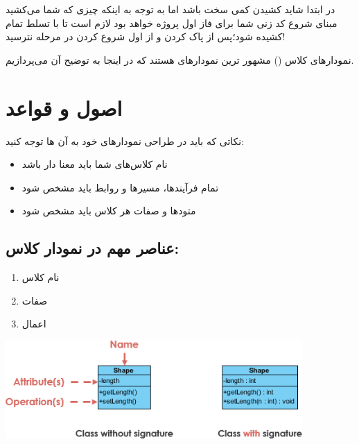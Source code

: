 \documentclass[]{article}
\begin{document}
در ابتدا شاید کشیدن  کمی سخت باشد اما به توجه به اینکه چیزی که شما می‌کشید مبنای شروع کد زنی شما برای فاز اول پروژه خواهد بود لازم است تا با تسلط تمام کشیده شود؛پس از پاک کردن و از اول شروع کردن در مرحله  نترسید! 

نمودارهای کلاس () مشهور ترین نمودارهای  هستند که در اینجا به توضیح آن می‌پردازیم.

\newpage

\section*{{\titr اصول و قواعد }}

نکاتی که باید در طراحی نمودارهای خود به آن ها توجه کنید:

\begin{itemize}

\item
نام کلاس‌های شما باید معنا دار باشد

\item
تمام فرآیندها، مسیرها و روابط باید مشخص شود

\item
متودها و صفات هر کلاس باید مشخص شود



\end{itemize}


\subsection*{{\titr عناصر مهم در نمودار کلاس:}}

\begin{enumerate}

\item
نام کلاس

\item
صفات

\item
اعمال

\end{enumerate}


\begin{center}

\includegraphics[width=0.85\textwidth]{images/image11.png}

\end{center}
\end{document}
